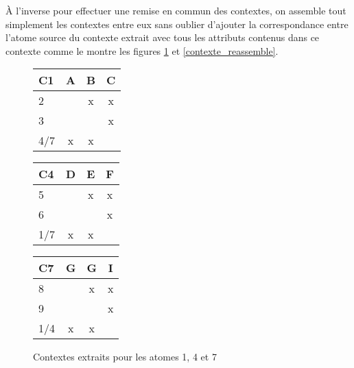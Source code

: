 À l'inverse pour effectuer une remise en commun des contextes, on assemble tout simplement les contextes entre eux sans oublier d'ajouter la correspondance entre l'atome source du contexte extrait avec tous les attributs contenus dans ce contexte comme le montre les figures \ref{contextes_extraits} et \ref{contexte_reassemble}.

\begin{figure}[H]
	\begin{minipage}[c]{0.3\textwidth}
	\begin{center}
		\begin{minipage}[c]{1\textwidth}
		\begin{center}
			\begin{tabular}{ l | c c c }
				C1 & A & B & C \\
				\hline
				2 & & x & x \\
				3 & & & x \\
				4/7 & x & x & \\
			\end{tabular}
		\end{center}
		\end{minipage}
		\begin{minipage}[c]{1\textwidth}
		\begin{center}
			\begin{tabular}{ l | c c c }
				C4 & D & E & F \\
				\hline
				5 & & x & x \\
				6 & & & x \\
				1/7 & x & x & \\
			\end{tabular}
		\end{center}
		\end{minipage}
		\begin{minipage}[c]{1\textwidth}
		\begin{center}
			\begin{tabular}{ l | c c c }
				C7 & G & G & I \\
				\hline
				8 & & x & x \\
				9 & & & x \\
				1/4 & x & x & \\
			\end{tabular}
		\end{center}
		\end{minipage}
	\end{center}
	\caption{Contextes extraits pour les atomes 1, 4 et 7}
	\label{contextes_extraits}
	\end{minipage}

\end{figure}
